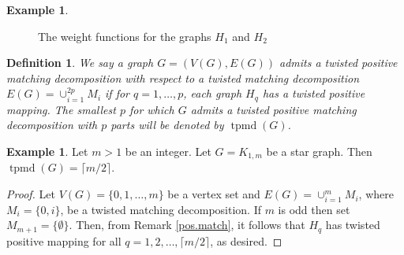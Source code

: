 \documentclass[11pt,a4paper,reqno]{amsart}
\newtheorem{definition}[thm]{Definition}
\theoremstyle{definition}
\newtheorem{eg}[thm]{Example}
\numberwithin{equation}{section}
\DeclareMathOperator{\tpmd}{tpmd}
\begin{document}
\begin{eg}
\begin{figure}[ht]
\caption{The weight functions for the graphs $H_1$ and $H_2$}
\label{fig.whq}
\end{figure}
\end{eg}

\begin{definition}
    We say a graph $G=(V(G),E(G))$ admits a twisted positive matching decomposition with respect to a twisted matching decomposition $E(G)=\cup_{i=1}^{2p}M_i$ if for $q=1, \ldots, p$, each graph $H_q$  has a twisted positive mapping. 
    The smallest $p$ for which $G$ admits a twisted positive matching decomposition with $p$ parts will be denoted by $\tpmd(G)$.
\end{definition}


\begin{eg}
    Let $m>1$ be an integer. Let $G=K_{1,m}$ be a star graph. Then $\tpmd(G)=\lceil m/2\rceil$.
    \begin{proof}
        Let $V(G)=\{0,1,\ldots,m\}$ be a vertex set and $E(G)=\cup_{i=1}^{m}M_i$, where $M_i=\{0,i\}$, be a twisted matching decomposition. If $m$ is odd then set $M_{m+1}=\{\emptyset\}$. Then, from Remark \ref{pos.match}, it follows that $H_q$ has twisted positive mapping for all $q=1,2,\ldots,\lceil m/2\rceil$, as desired.
    \end{proof}
\end{eg}
\end{document}
